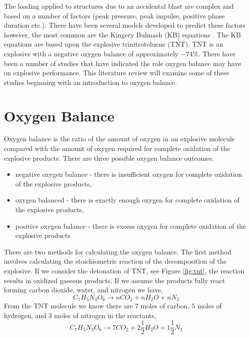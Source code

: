 The loading applied to structures due to an accidental blast are complex and based on a number of factors (peak pressure, peak  impulse, positive phase duration etc.).  There have been several models developed to predict these factors however, the most common are the Kingery Bulmash (KB) equations \cite{Kingery1984}.  The KB equations are based upon the explosive trinitrotoluene (TNT).  TNT is an explosive with a negative oxygen balance of approximately $-74\%$.  There have been a number of studies that have indicated the role oxygen balance may have on explosive performance.  This literature review will examine some of these studies beginning with an introduction to oxygen balance.

\section{Oxygen Balance}
Oxygen balance is the ratio of the amount of oxygen in an explosive molecule compared with the amount of oxygen required for complete oxidation of the explosive products.  There are three possible oxygen balance outcomes:
\begin{itemize}
\item negative oxygen balance - there is insufficient oxygen for complete oxidation of the explosive products,
\item oxygen balanced - there is exactly enough oxygen for complete oxidation of the explosive products,
\item positive oxygen balance - there is excess oxygen for complete oxidation of the explosive products
\end{itemize}
There are two methods for calculating the oxygen balance.  The first method involves calculating the stoichiometric reaction of the decomposition of the explosive.  If we consider the detonation of TNT, see Figure \ref{fig:tnt}, the reaction results in oxidized gaseous products.  If we assume the products fully react forming carbon dioxide, water, and nitrogen we have,
\begin{equation}\label{eq:tnt_1}
C_7H_5N_3O_6 \rightarrow nCO_2+nH_2O+nN_2
\end{equation}
From the TNT molecule we know there are $7$ moles of carbon, $5$ moles of hydrogen, and $3$ moles of nitrogen in the reactants,
\begin{equation}\label{eq:tnt_2}
C_7H_5N_3O_6 \rightarrow 7CO_2+2\frac{1}{2}H_2O+1\frac{1}{2}N_2
\end{equation}
